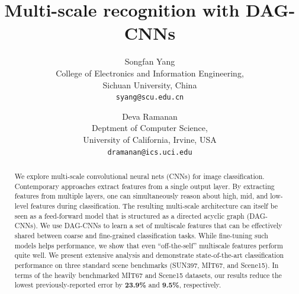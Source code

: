 \documentclass[10pt,twocolumn,letterpaper]{article}
\begin{document}
\title{Multi-scale recognition with DAG-CNNs}

\author{Songfan Yang\\
College of Electronics and Information Engineering,\\
Sichuan University, China\\
{\tt\small syang@scu.edu.cn}
\and
Deva Ramanan\\
Deptment of Computer Science,\\
University of California, Irvine, USA\\
{\tt\small dramanan@ics.uci.edu}
}

\maketitle


\begin{abstract}
We explore multi-scale convolutional neural nets (CNNs) for image classification. Contemporary approaches extract features from a single output layer. By extracting features from multiple layers, one can simultaneously reason about high, mid, and low-level features during classification. The resulting multi-scale architecture can itself be seen as a feed-forward model that is structured as a directed acyclic graph (DAG-CNNs). %
We use DAG-CNNs to learn a set of multiscale features that can be effectively shared between coarse and fine-grained classification tasks. While fine-tuning such models helps performance, we show that even ``off-the-self'' multiscale features perform quite well. We present extensive analysis and demonstrate state-of-the-art classification performance on three standard scene benchmarks (SUN397, MIT67, and Scene15). %
In terms of the heavily benchmarked MIT67 and Scene15 datasets, our results reduce the lowest previously-reported error by {\bf 23.9\%} and {\bf 9.5\%}, respectively.
\end{abstract}
\end{document}
